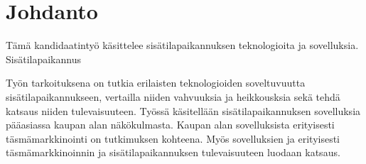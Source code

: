 \section{Johdanto}
Tämä kandidaatintyö käsittelee sisätilapaikannuksen teknologioita ja sovelluksia. Sisätilapaikannus  

Työn tarkoituksena on tutkia erilaisten teknologioiden soveltuvuutta sisätilapaikannukseen, vertailla niiden vahvuuksia ja heikkousksia sekä tehdä katsaus niiden tulevaisuuteen. Työssä käsitellään sisätilapaikannuksen sovelluksia pääasiassa kaupan alan näkökulmasta. Kaupan alan sovelluksista erityisesti täsmämarkkinointi on tutkimuksen kohteena. Myös sovelluksien ja erityisesti täsmämarkkinoinnin ja sisätilapaikannuksen tulevaisuuteen luodaan katsaus.